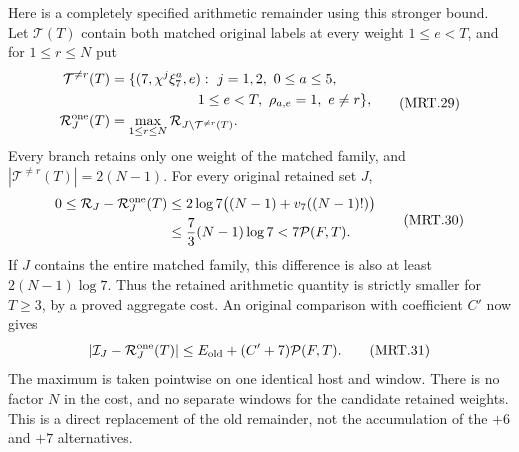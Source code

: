 \begin{theorem}
Here is a completely specified arithmetic remainder using this
stronger bound.  Let $\mathcal T(T)$ contain both matched original
labels at every weight $1\leq e<T$, and for $1\leq r\leq N$ put
\[
 \begin{split}
 \mathcal T^{\ne r}(T)&=\{(7,\chi^j\xi_7^a,e):\ j=1,2,
       \ 0\leq a\leq5,\\
       &\hspace{22mm}1\leq e<T,\ \rho_{a,e}=1,\ e\ne r\},\\
 \mathcal R_J^{\rm one}(T)&=\max_{1\leq r\leq N}
                     \mathcal R_{J\setminus\mathcal T^{\ne r}(T)}.
 \end{split}                                                   \tag{MRT.29}
\]
Every branch retains only one weight of the matched family, and
$|\mathcal T^{\ne r}(T)|=2(N-1)$.  For every original retained set $J$,
\[
 \begin{split}
 0\leq\mathcal R_J-\mathcal R_J^{\rm one}(T)
 &\leq2\log7\bigl((N-1)+v_7((N-1)!)\bigr)\\
 &\leq\frac73(N-1)\log7<7\mathcal P(F,T).
 \end{split}                                                   \tag{MRT.30}
\]
If $J$ contains the entire matched family, this difference is also
at least $2(N-1)\log7$.  Thus the retained arithmetic quantity is
strictly smaller for $T\geq3$, by a proved aggregate cost.
An original comparison with coefficient $C'$ now gives
\[
 |\mathcal I_J-\mathcal R_J^{\rm one}(T)|
       \leq E_{\rm old}+(C'+7)\mathcal P(F,T).                  \tag{MRT.31}
\]
The maximum is taken pointwise on one identical host and window.
There is no factor $N$ in the cost, and no separate windows for the
candidate retained weights.  This is a direct replacement of the
old remainder, not the accumulation of the $+6$ and $+7$ alternatives.

\end{theorem}

